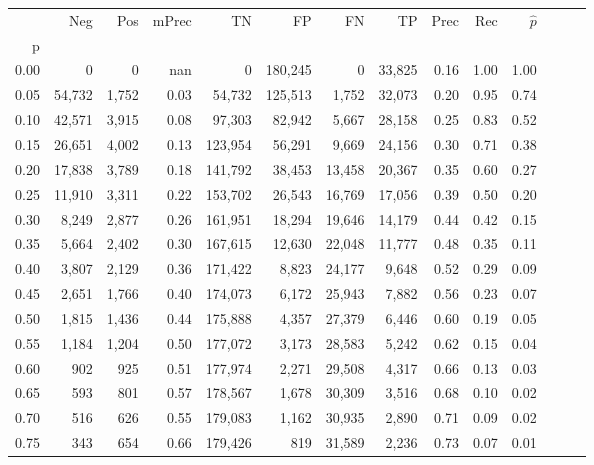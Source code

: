 \begin{tabular}{rrrrrrrrrrrrrr}
\toprule
{} &     Neg &    Pos & mPrec &       TN &       FP &      FN &      TP &  Prec &   Rec & $\hat{p}$ \\
p    &         &        &       &          &          &         &         &       &       &           \\
\midrule
0.00 &       0 &      0 &   nan &        0 &  180,245 &       0 &  33,825 &  0.16 &  1.00 &      1.00 \\
0.05 &  54,732 &  1,752 &  0.03 &   54,732 &  125,513 &   1,752 &  32,073 &  0.20 &  0.95 &      0.74 \\
0.10 &  42,571 &  3,915 &  0.08 &   97,303 &   82,942 &   5,667 &  28,158 &  0.25 &  0.83 &      0.52 \\
0.15 &  26,651 &  4,002 &  0.13 &  123,954 &   56,291 &   9,669 &  24,156 &  0.30 &  0.71 &      0.38 \\
0.20 &  17,838 &  3,789 &  0.18 &  141,792 &   38,453 &  13,458 &  20,367 &  0.35 &  0.60 &      0.27 \\
0.25 &  11,910 &  3,311 &  0.22 &  153,702 &   26,543 &  16,769 &  17,056 &  0.39 &  0.50 &      0.20 \\
0.30 &   8,249 &  2,877 &  0.26 &  161,951 &   18,294 &  19,646 &  14,179 &  0.44 &  0.42 &      0.15 \\
0.35 &   5,664 &  2,402 &  0.30 &  167,615 &   12,630 &  22,048 &  11,777 &  0.48 &  0.35 &      0.11 \\
0.40 &   3,807 &  2,129 &  0.36 &  171,422 &    8,823 &  24,177 &   9,648 &  0.52 &  0.29 &      0.09 \\
0.45 &   2,651 &  1,766 &  0.40 &  174,073 &    6,172 &  25,943 &   7,882 &  0.56 &  0.23 &      0.07 \\
0.50 &   1,815 &  1,436 &  0.44 &  175,888 &    4,357 &  27,379 &   6,446 &  0.60 &  0.19 &      0.05 \\
0.55 &   1,184 &  1,204 &  0.50 &  177,072 &    3,173 &  28,583 &   5,242 &  0.62 &  0.15 &      0.04 \\
0.60 &     902 &    925 &  0.51 &  177,974 &    2,271 &  29,508 &   4,317 &  0.66 &  0.13 &      0.03 \\
0.65 &     593 &    801 &  0.57 &  178,567 &    1,678 &  30,309 &   3,516 &  0.68 &  0.10 &      0.02 \\
0.70 &     516 &    626 &  0.55 &  179,083 &    1,162 &  30,935 &   2,890 &  0.71 &  0.09 &      0.02 \\
0.75 &     343 &    654 &  0.66 &  179,426 &      819 &  31,589 &   2,236 &  0.73 &  0.07 &      0.01 \\

\end{tabular}
